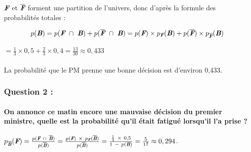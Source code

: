 \documentclass[a4paper, 12pt]{article}
\begin{document}
\begin{center}
\end{center}
\vspace{3mm}
$\emph{\textbf{F}}$ et $\overline{\emph{\textbf{F}}}$ forment une partition de l'univers, donc d'après la formule des probabilités totales :
\begin{fleqn}
\[p(\emph{\textbf{B}}) = p(\emph{\textbf{F}}\  \cap \ \emph{\textbf{B}}) + p(\overline{\emph{\textbf{F}}}\ \cap \ \emph{\textbf{B}}) 
= p(\emph{\textbf{F}}) \times p_{\emph{\textbf{F}}}(\emph{\textbf{B}}) + p(\overline{\emph{\textbf{F}}}) \times p_{\overline{\emph{\textbf{F}}}}(\emph{\textbf{B}}) \]
\end{fleqn}
$= \frac{1}{3} \times 0,5 + \frac{2}{3} \times 0,4 = \frac{13}{30} \approx 0,433$
\\ \\
La probabilité que le PM prenne une bonne décision est d'environ 0,433.

{}
\subsubsection*{Question 2 :}
\paragraph*{On annonce ce matin encore une mauvaise décision du premier ministre, quelle est la probabilité qu'il était fatigué lorsqu'il l'a prise ?\\[5mm]}

$p_{\overline{\emph{\textbf{B}}}}(\emph{\textbf{F}}) = \frac{p(\emph{\textbf{F}}\ \cap \ \overline{\emph{\textbf{B}}})}{p(\overline{\emph{\textbf{B}}})}
= \frac{p(\emph{\textbf{F}})\ \times \ p_{\emph{\textbf{F}}}(\overline{\emph{\textbf{B}}})}{p(\overline{\emph{\textbf{B}}})}
= \frac{\frac{1}{3}\ \times \ 0,5}{1\ -\ p(\emph{\textbf{B}})} = \frac{5}{17} \approx 0,294$.
\end{document}
